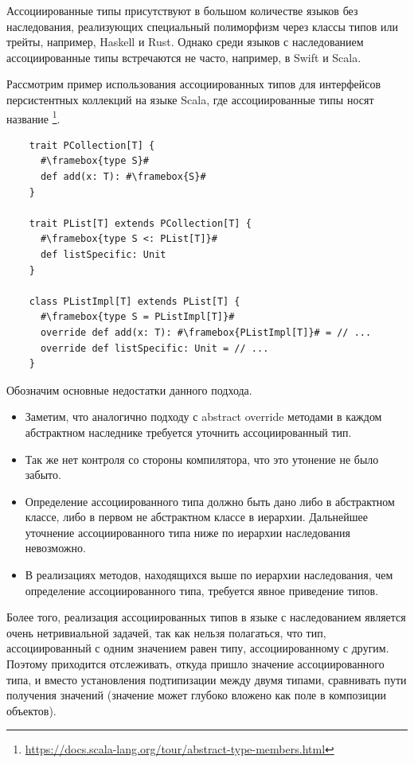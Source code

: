 Ассоциированные типы присутствуют в большом количестве языков без наследования, реализующих специальный полиморфизм через классы типов или трейты, например, Haskell и Rust.
Однако среди языков с наследованием ассоциированные типы встречаются не часто, например, в Swift и Scala.

Рассмотрим пример использования ассоциированных типов для интерфейсов персистентных коллекций на языке Scala, где ассоциированные типы носят название \footnote{\url{https://docs.scala-lang.org/tour/abstract-type-members.html}}.

\begin{verbatim}
    trait PCollection[T] {
      #\framebox{type S}#
      def add(x: T): #\framebox{S}#
    }

    trait PList[T] extends PCollection[T] {
      #\framebox{type S <: PList[T]}#
      def listSpecific: Unit
    }

    class PListImpl[T] extends PList[T] {
      #\framebox{type S = PListImpl[T]}#
      override def add(x: T): #\framebox{PListImpl[T]}# = // ...
      override def listSpecific: Unit = // ...
    }
\end{verbatim}

Обозначим основные недостатки данного подхода.

\begin{itemize}
    \item Заметим, что аналогично подходу с abstract override методами в каждом абстрактном наследнике требуется уточнить ассоциированный тип.
    \item Так же нет контроля со стороны компилятора, что это утонение не было забыто.
    \item Определение ассоциированного типа должно быть дано либо в абстрактном классе, либо в первом не абстрактном классе в иерархии.
    Дальнейшее уточнение ассоциированного типа ниже по иерархии наследования невозможно.
    \item В реализациях методов, находящихся выше по иерархии наследования, чем определение ассоциированного типа, требуется явное приведение типов.
\end{itemize}

Более того, реализация ассоциированных типов в языке с наследованием является очень нетривиальной задачей, так как нельзя полагаться, что тип, ассоциированный с одним значением равен типу, ассоциированному с другим.
Поэтому приходится отслеживать, откуда пришло значение ассоциированного типа, и вместо установления подтипизации между двумя типами, сравнивать пути получения значений (значение может глубоко вложено как поле в композиции объектов).


